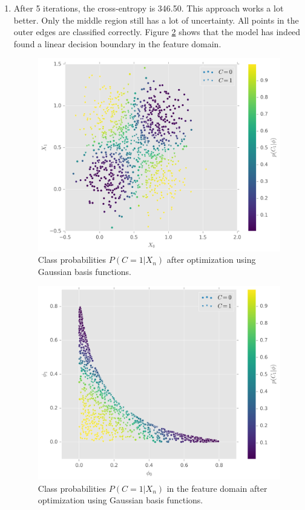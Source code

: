 \documentclass{article}
\begin{document}
\begin{enumerate}
\begin{lstlisting}
gauss_2 = MvNormal([1, 1], sigma)
phi = zeros(3, N)
for i in 1:N
    phi[1, i] = 1
    phi[2, i] = pdf(gauss_1, X[i, :])
    phi[3, i] = pdf(gauss_2, X[i, :])
end
\end{lstlisting}
\item After 5 iterations, the cross-entropy is 346.50. This approach works a lot better. Only the middle region still has a lot of uncertainty. All points in the outer edges are classified correctly. Figure \ref{fig:scatter_probs_features} shows that the model has indeed found a linear decision boundary in the feature domain.
\begin{figure}[H]
\centering
\includegraphics[width=.6\textwidth]{images/scatter_probs_gauss.png}
\caption{Class probabilities $P(C=1|X_n)$ after optimization using Gaussian basis functions.}
\label{fig:scatter_probs_gauss}
\end{figure}
\begin{figure}[H]
\centering
\includegraphics[width=.6\textwidth]{images/scatter_probs_gauss_features.png}
\caption{Class probabilities $P(C=1|X_n)$ in the feature domain after optimization using Gaussian basis functions.}
\label{fig:scatter_probs_features}
\end{figure}
\end{enumerate}
\end{document}

